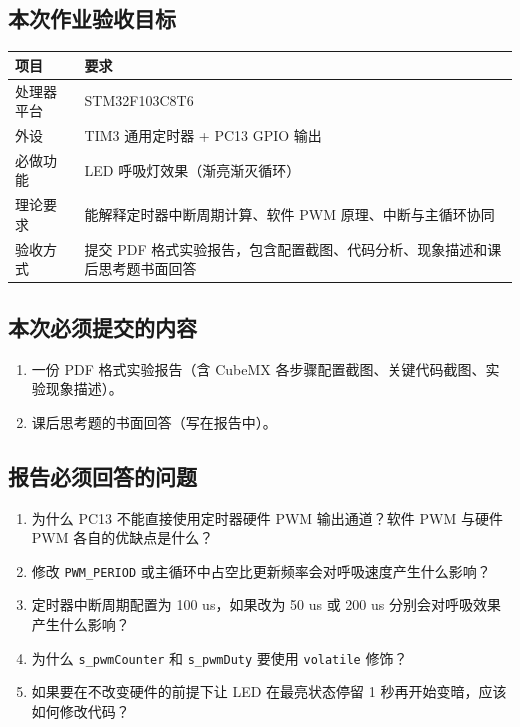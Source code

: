 \documentclass[
  chinese,
  UTF8,
  oneside,
  openany]{ctexbook}
\providecommand{\tightlist}{%
  \setlength{\itemsep}{0pt}\setlength{\parskip}{0pt}}
\begin{document}
\subsection{本次作业验收目标}\label{ux672cux6b21ux4f5cux4e1aux9a8cux6536ux76eeux6807-6}

\begin{longtable}[]{@{}
  >{\raggedright\arraybackslash}p{}
  >{\raggedright\arraybackslash}p{}@{}}
\toprule\noalign{}
\begin{minipage}[b]{\linewidth}\raggedright
项目
\end{minipage} & \begin{minipage}[b]{\linewidth}\raggedright
要求
\end{minipage} \\
\midrule\noalign{}
\endhead
\bottomrule\noalign{}
\endlastfoot
处理器平台 & STM32F103C8T6 \\
外设 & TIM3 通用定时器 + PC13 GPIO 输出 \\
必做功能 & LED 呼吸灯效果（渐亮渐灭循环） \\
理论要求 & 能解释定时器中断周期计算、软件 PWM 原理、中断与主循环协同 \\
验收方式 & 提交 PDF
格式实验报告，包含配置截图、代码分析、现象描述和课后思考题书面回答 \\
\end{longtable}

\subsection{本次必须提交的内容}\label{ux672cux6b21ux5fc5ux987bux63d0ux4ea4ux7684ux5185ux5bb9-6}

\begin{enumerate}
\def\labelenumi{\arabic{enumi}.}
\tightlist
\item
  一份 PDF 格式实验报告（含 CubeMX
  各步骤配置截图、关键代码截图、实验现象描述）。
\item
  课后思考题的书面回答（写在报告中）。
\end{enumerate}

\subsection{报告必须回答的问题}\label{ux62a5ux544aux5fc5ux987bux56deux7b54ux7684ux95eeux9898-6}

\begin{enumerate}
\def\labelenumi{\arabic{enumi}.}
\tightlist
\item
  为什么 PC13 不能直接使用定时器硬件 PWM 输出通道？软件 PWM 与硬件 PWM
  各自的优缺点是什么？
\item
  修改 \texttt{PWM\_PERIOD}
  或主循环中占空比更新频率会对呼吸速度产生什么影响？
\item
  定时器中断周期配置为 100 us，如果改为 50 us 或 200 us
  分别会对呼吸效果产生什么影响？
\item
  为什么 \texttt{s\_pwmCounter} 和 \texttt{s\_pwmDuty} 要使用
  \texttt{volatile} 修饰？
\item
  如果要在不改变硬件的前提下让 LED 在最亮状态停留 1
  秒再开始变暗，应该如何修改代码？
\end{enumerate}
\end{document}
